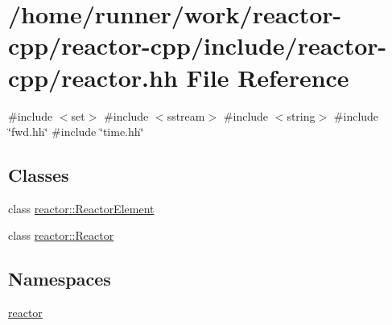 \hypertarget{reactor_8hh}{}\section{/home/runner/work/reactor-\/cpp/reactor-\/cpp/include/reactor-\/cpp/reactor.hh File Reference}
\label{reactor_8hh}
{\ttfamily \#include $<$set$>$}\newline
{\ttfamily \#include $<$sstream$>$}\newline
{\ttfamily \#include $<$string$>$}\newline
{\ttfamily \#include \char`\"{}fwd.\+hh\char`\"{}}\newline
{\ttfamily \#include \char`\"{}time.\+hh\char`\"{}}\newline
\subsection*{Classes}
\begin{DoxyCompactItemize}
\item 
class \hyperlink{classreactor_1_1ReactorElement}{reactor\+::\+Reactor\+Element}
\item 
class \hyperlink{classreactor_1_1Reactor}{reactor\+::\+Reactor}
\end{DoxyCompactItemize}
\subsection*{Namespaces}
\begin{DoxyCompactItemize}
\item 
 \hyperlink{namespacereactor}{reactor}
\end{DoxyCompactItemize}
